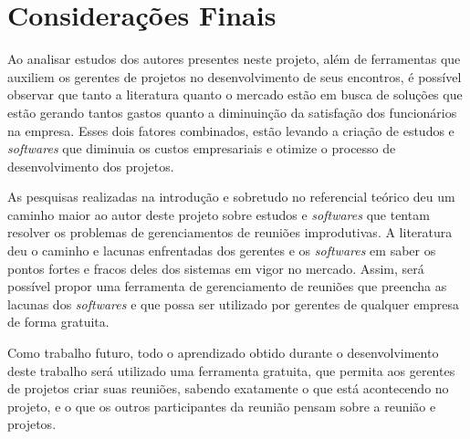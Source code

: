 \chapter{Considerações Finais}
\label{cp:consideracoes}

Ao analisar estudos dos autores presentes neste projeto, além de ferramentas que auxiliem os gerentes de projetos no desenvolvimento de seus encontros, é possível observar que tanto a literatura quanto o mercado estão em busca de soluções que estão gerando tantos gastos quanto a diminuinção da satisfação dos funcionários na empresa. Esses dois fatores combinados, estão levando a criação de estudos e \textit{softwares} que diminuia os custos empresariais e otimize o processo de desenvolvimento dos projetos.

As pesquisas realizadas na introdução e sobretudo no referencial teórico deu um caminho maior ao autor deste projeto sobre estudos e \textit{softwares} que tentam resolver os problemas de gerenciamentos de reuniões improdutivas. A literatura deu o caminho e lacunas enfrentadas dos gerentes e os \textit{softwares} em saber os pontos fortes e fracos deles dos sistemas em vigor no mercado. Assim, será possível propor uma ferramenta de gerenciamento de reuniões que preencha as lacunas dos \textit{softwares} e que possa ser utilizado por gerentes de qualquer empresa de forma gratuita.

Como trabalho futuro, todo o aprendizado obtido durante o desenvolvimento deste trabalho será utilizado uma ferramenta gratuita, que permita aos gerentes de projetos criar suas reuniões, sabendo exatamente o que está acontecendo no projeto, e o que os outros participantes da reunião pensam sobre a reunião e projetos.